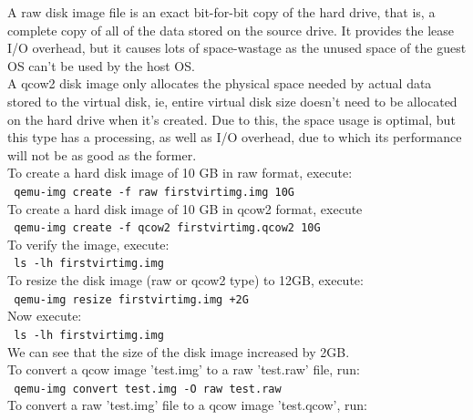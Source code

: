 \documentclass[12pt,a4paper]{article}
\begin{document}
A raw disk image file is an exact bit-for-bit copy of the hard drive, that is, a complete copy of all of the data stored on the source drive. It provides the lease I/O overhead, but it causes lots of space-wastage as the unused space of the guest OS can't be used by the host OS.\\
A qcow2 disk image only allocates the physical space needed by actual data stored to the virtual disk, ie, entire virtual disk size doesn’t need to be allocated on the hard drive when it’s created. Due to this, the space usage is optimal, but this type has a processing, as well as I/O overhead, due to which its performance will not be as good as the former.\\
\newline
To create a hard disk image of 10 GB in raw format, execute:\\
\newline
\texttt{\ qemu-img create -f raw firstvirtimg.img 10G}\\
\newline
To create a hard disk image of 10 GB in qcow2 format, execute\\
\newline
\texttt{\ qemu-img create -f qcow2 firstvirtimg.qcow2 10G}\\
\newline
To verify the image, execute:\\
\newline
\texttt{\ ls -lh firstvirtimg.img}\\
\newline
To resize the disk image (raw or qcow2 type) to 12GB, execute:\\
\newline
\texttt{\ qemu-img resize firstvirtimg.img +2G }\\
\newline
Now execute:\\
\newline
\texttt{\ ls -lh firstvirtimg.img }\\
\newline
We can see that the size of the disk image increased by 2GB.\\
To convert a qcow image 'test.img' to a raw 'test.raw' file, run:\\
\newline
\texttt{\ qemu-img convert test.img -O raw test.raw}\\
\newline
To convert a raw 'test.img' file to a qcow image 'test.qcow', run:\\
\end{document}

